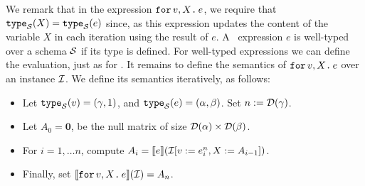 %
We remark that in the expression $\texttt{for}\, v,X \texttt{.}\, e$, we require that $\texttt{type}_{\mathcal{S}}(X) = \texttt{type}_{\mathcal{S}}(e)$ since, as this expression updates the content of the variable $X$ in each iteration using the result of $e$. 
%
A \langfor\ expression $e$ is well-typed over a schema $\mathcal{S}$ if its type is defined. For well-typed expressions we can define the evaluation, just as for \lang. It remains
to define the semantics of $\texttt{for}\, v,X \texttt{.}\, e$ over an instance $\mathcal{I}$. We define its semantics iteratively, as follows:
\begin{itemize}
\item Let $\texttt{type}_{\mathcal{S}}(v)= (\gamma,1)$, and $\texttt{type}_{\mathcal{S}}(e) = (\alpha,\beta)$. Set $n := \mathcal{D}(\gamma)$.
\item Let $A_0 = \mathbf{0}$, be the null matrix of size $\mathcal{D}(\alpha)\times \mathcal{D}(\beta)$.
\item For $i=1,\ldots n$, compute $A_i = \llbracket e \rrbracket(\mathcal{I}[v := e^{n}_i, X:= A_{i-1}])$.
\item Finally, set $\llbracket \texttt{for}\, v,X \texttt{.}\, e \rrbracket(\mathcal{I}) = A_{n}$.
\end{itemize}

